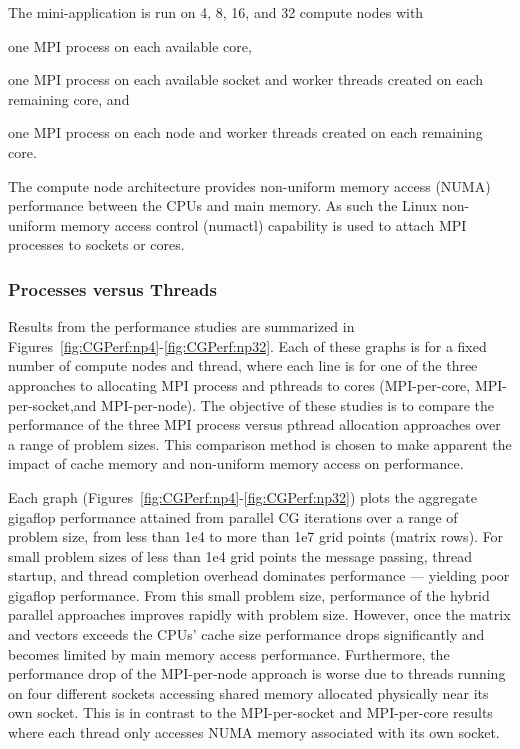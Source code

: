 The mini-application is run on 4, 8, 16, and 32 compute nodes with
\begin{blist}
\item one MPI process on each available core,
\item one MPI process on each available socket and worker threads created on each remaining core, and
\item one MPI process on each node and worker threads created on each remaining core.
\end{blist}
%
The compute node architecture provides non-uniform memory access (NUMA) performance between the CPUs and main memory.
%
As such the Linux non-uniform memory access control (numactl) capability is used to attach MPI processes to sockets or cores.



\subsubsection{Processes versus Threads}

Results from the performance studies are summarized in Figures~\ref{fig:CGPerf:np4}-\ref{fig:CGPerf:np32}.
%
Each of these graphs is for a fixed number of compute nodes and thread, where each line is for one of the three approaches to allocating MPI process and pthreads to cores (MPI-per-core, MPI-per-socket,and MPI-per-node).
%
The objective of these studies is to compare the performance of the three MPI process versus pthread allocation approaches over a range of problem sizes.
%
This comparison method is chosen to make apparent the impact of cache memory and non-uniform memory access on performance.


Each graph (Figures~\ref{fig:CGPerf:np4}-\ref{fig:CGPerf:np32}) plots the aggregate gigaflop performance attained from parallel CG iterations over a range of problem size, from less than 1e4 to more than 1e7 grid points (matrix rows).
%
For small problem sizes of less than 1e4 grid points the message passing, thread startup, and thread completion overhead dominates performance --- yielding poor gigaflop performance.
%
From this small problem size, performance of the hybrid parallel approaches improves rapidly with problem size.
%
However, once the matrix and vectors exceeds the CPUs' cache size performance drops significantly and becomes limited by main memory access performance.
%
Furthermore, the performance drop of the MPI-per-node approach is worse due to threads running on four different sockets accessing shared memory allocated physically near its own socket.
%
This is in contrast to the MPI-per-socket and MPI-per-core results where each thread only accesses NUMA memory associated with its own socket.

